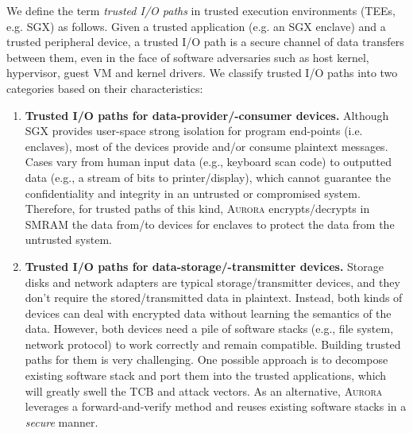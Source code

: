 We define the term \emph{trusted I/O paths} in trusted execution environments (TEEs, e.g. SGX) as follows. Given a trusted application (e.g. an SGX enclave) and a trusted peripheral device, a trusted I/O path is a secure channel of data transfers between them, even in the face of software adversaries such as host kernel, hypervisor, guest VM and kernel drivers. We classify trusted I/O paths into two categories based on their characteristics:

\begin{enumerate}

\item \textbf{Trusted I/O paths for data-provider/-consumer devices.}
Although SGX provides user-space strong isolation for program end-points (i.e. enclaves), most of the devices provide and/or consume plaintext messages. Cases vary from human input data (e.g., keyboard scan code) to outputted data (e.g., a stream of bits to printer/display), which cannot guarantee the confidentiality and integrity in an untrusted or compromised system. Therefore, for trusted paths of this kind, \textsc{Aurora} encrypts/decrypts in SMRAM the data from/to devices for enclaves to protect the data from the untrusted system.

\item \textbf{Trusted I/O paths for data-storage/-transmitter devices.} Storage disks and network adapters are typical storage/transmitter devices, and they don't require the stored/transmitted data in plaintext. Instead, both kinds of devices can deal with encrypted data without learning the semantics of the data. However, both devices need a pile of software stacks (e.g., file system, network protocol) to work correctly and remain compatible. Building trusted paths for them is very challenging. One possible approach is to decompose existing software stack and port them into the trusted applications, which will greatly swell the TCB and attack vectors. As an alternative, \textsc{Aurora} leverages a forward-and-verify method and reuses existing software stacks in a \emph{secure} manner.

\end{enumerate}

